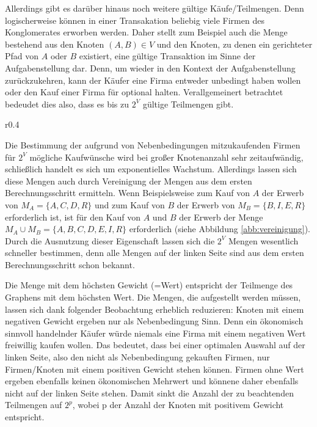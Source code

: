 Allerdings gibt es darüber hinaus noch weitere gültige Käufe/Teilmengen. Denn logischerweise können in einer Transakation beliebig viele Firmen des Konglomerates erworben werden. Daher stellt zum Beispiel auch die Menge bestehend aus den Knoten \((A, B) \in V\) und den Knoten, zu denen ein gerichteter Pfad von \(A\) oder \(B\) existiert, eine gültige Transaktion im Sinne der Aufgabenstellung dar. Denn, um wieder in den Kontext der Aufgabenstellung zurückzukehren, kann der Käufer eine Firma entweder unbedingt haben wollen oder den Kauf einer Firma für optional halten. Verallgemeinert betrachtet bedeudet dies also, dass es bis zu \(2^V\) gültige Teilmengen gibt.

\begin{wrapfigure}{r}{0.4\textwidth}
  \begin{center}
    
  \end{center}
  \caption{Beispielgraph}
  \label{abb:vereinigung}
\end{wrapfigure}


Die Bestimmung der aufgrund von Nebenbedingungen mitzukaufenden Firmen für \(2^V\) mögliche Kaufwünsche wird bei großer Knotenanzahl sehr zeitaufwändig, schließlich handelt es sich um exponentielles Wachstum. Allerdings lassen sich diese Mengen auch durch Vereinigung der Mengen aus dem ersten Berechnungsschritt ermitteln. Wenn Beispielsweise zum Kauf von \(A\) der Erwerb von \(M_A=\{A, C, D, R\}\) und zum Kauf von \(B\) der Erwerb von \(M_B = \{B, I, E, R\}\) erforderlich ist, ist für den Kauf von \(A\) und \(B\) der Erwerb der Menge \(M_A \cup M_B = \{A, B, C, D, E, I, R\}\) erforderlich (siehe Abbildung \ref{abb:vereinigung}). Durch die Ausnutzung dieser Eigenschaft lassen sich die \(2^V\) Mengen wesentlich schneller bestimmen, denn alle Mengen auf der linken Seite sind aus dem ersten Berechnungsschritt schon bekannt.

Die Menge mit dem höchsten Gewicht (=Wert) entspricht der Teilmenge des Graphens mit dem höchsten Wert.
Die Mengen, die aufgestellt werden müssen, lassen sich dank folgender Beobachtung erheblich reduzieren:
Knoten mit einem negativen Gewicht ergeben nur als Nebenbedingung Sinn. Denn ein ökonomisch sinnvoll handelnder Käufer würde niemals eine Firma mit einem negativen Wert freiwillig kaufen wollen. Das bedeutet, dass bei einer optimalen Auswahl auf der linken Seite, also den nicht als Nebenbedingung gekauften Firmen, nur Firmen/Knoten mit einem positiven Gewicht stehen können. Firmen ohne Wert ergeben ebenfalls keinen ökonomischen Mehrwert und könnene daher ebenfalls nicht auf der linken Seite stehen. Damit sinkt die Anzahl der zu beachtenden Teilmengen auf \(2^p\), wobei p der Anzahl der Knoten mit positivem Gewicht entspricht.

